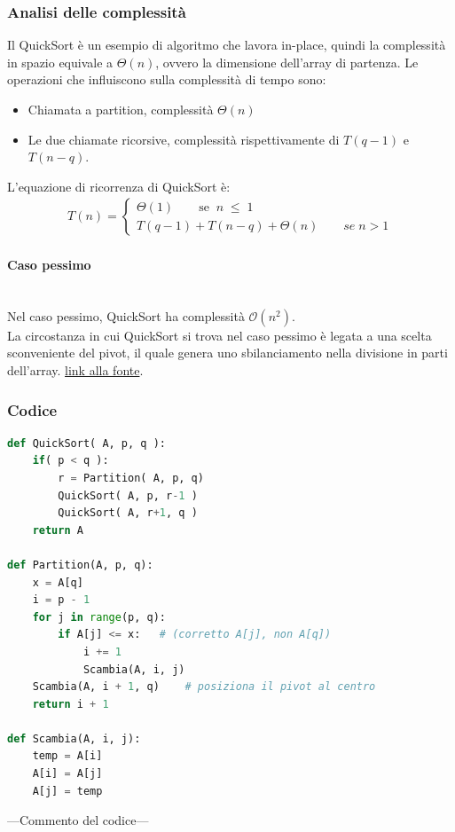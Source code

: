 \documentclass[a4paper, 11pt]{article}
\begin{document}
\subsubsection{Analisi delle complessità}
Il QuickSort è un esempio di algoritmo che lavora in-place, quindi la complessità in spazio equivale a $\Theta(n)$, ovvero la dimensione dell'array di partenza.\bigbreak
Le operazioni che influiscono sulla complessità di tempo sono:
\begin{itemize}
    \item Chiamata a partition, complessità $\Theta(n)$
    \item Le due chiamate ricorsive, complessità rispettivamente di $T(q-1)$ e $T(n-q)$.
\end{itemize}


L'equazione di ricorrenza di QuickSort è:
\begin{gather*}
    T(n) = 
    \begin{cases}
    \Theta(1)\quad\quad \text{se}\;\; n\; \leq\; 1 \\
    T(q - 1) + T(n - q) + \Theta(n)\quad\quad se\; n > 1
    \end{cases}     
\end{gather*}
 
\paragraph{Caso pessimo}\mbox{}\\
Nel caso pessimo, QuickSort ha complessità $\mathcal{O}(n^2)$.\\
La circostanza in cui QuickSort si trova nel caso pessimo è legata a una scelta sconveniente del pivot, il quale genera uno sbilanciamento nella divisione in parti dell'array.
\href{https://ifif.altervista.org/quicksort-come-funziona-esempio/?doing_wp_cron=1750427062.2481169700622558593750}{\color{blue}link alla fonte}.

\subsubsection{Codice}
\begin{lstlisting}[style=mycodestyle, language=Python]
def QuickSort( A, p, q ):
    if( p < q ):
        r = Partition( A, p, q)
        QuickSort( A, p, r-1 )
        QuickSort( A, r+1, q )
    return A

def Partition(A, p, q):
    x = A[q]
    i = p - 1
    for j in range(p, q):
        if A[j] <= x:   # (corretto A[j], non A[q])
            i += 1
            Scambia(A, i, j)
    Scambia(A, i + 1, q)    # posiziona il pivot al centro
    return i + 1

def Scambia(A, i, j):
    temp = A[i]
    A[i] = A[j]
    A[j] = temp
\end{lstlisting}
---Commento del codice---
\end{document}
